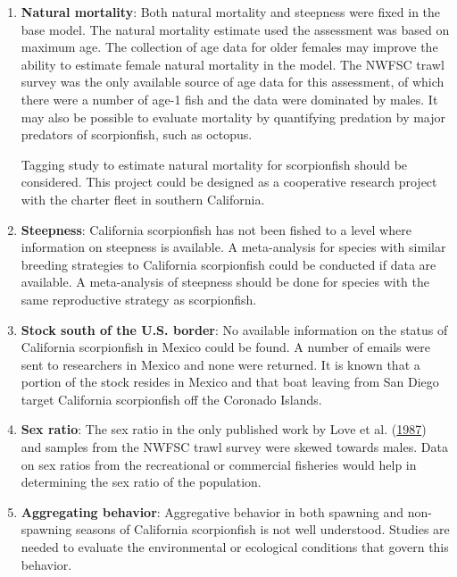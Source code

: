 \documentclass[12pt,]{article}
\begin{document}
\begin{enumerate}

\item \textbf{Natural mortality}: Both natural mortality and steepness were 
fixed in the base model.  The natural mortality estimate used the assessment 
was based on maximum age. The collection of age data for older females may improve 
the ability to estimate female natural mortality in the model.  The NWFSC trawl survey
was the only available source of age data for this assessment, of which there were a 
number of age-1 fish and the data were dominated by males.  It may also be possible 
to evaluate mortality by quantifying predation by major predators of scorpionfish, 
such as octopus. 

Tagging study to estimate natural mortality for scorpionfish should be 
considered.  This project could be designed as a cooperative research project 
with the charter fleet in southern California.

\item \textbf{Steepness}: California scorpionfish has not been fished to a level 
where information on steepness is available.  A meta-analysis for species 
with similar breeding strategies to California scorpionfish could be conducted if data are available.  A meta-analysis of steepness should be done for species with the same reproductive strategy as scorpionfish.


\item \textbf{Stock south of the U.S. border}:  No available information on the status of California scorpionfish in Mexico could be found.  A number of emails were sent to researchers 
in Mexico and none were returned.  It is known that a portion of the stock resides 
in Mexico and that boat leaving from San Diego target California scorpionfish off 
the Coronado Islands.  

\item \textbf{Sex ratio}:  The sex ratio in the only published work by Love et al.
(\protect\hyperlink{ref-Love1987}{1987}) and samples 
from the NWFSC trawl survey were skewed towards males. Data on sex ratios from the 
recreational or commercial fisheries would help in determining the sex ratio of the population.


\item \textbf{Aggregating behavior}: Aggregative behavior in both spawning and 
non-spawning seasons of California scorpionfish is not well understood. Studies are 
needed to evaluate the environmental or ecological conditions that govern this behavior.




\end{enumerate}
\end{document}
